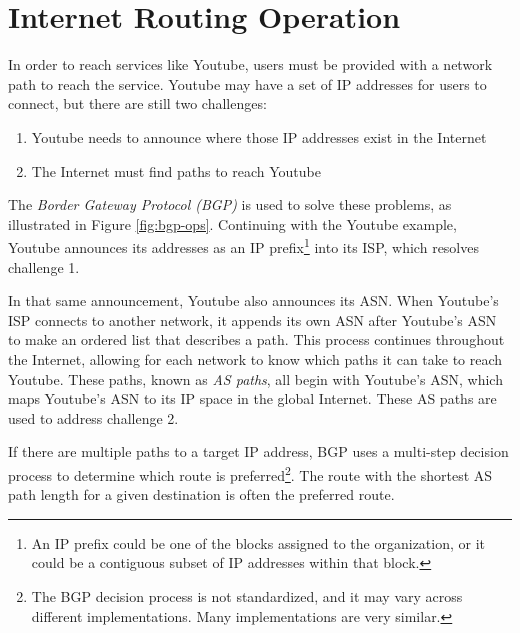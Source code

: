 \documentclass[conference]{IEEEtran}
\begin{document}
\section{Internet Routing Operation}
In order to reach services like Youtube, users must be provided with a network path to reach the service.  Youtube may have a set of IP addresses for users to connect, but there are still two challenges:
\begin{enumerate}
 \item Youtube needs to announce where those IP addresses exist in the Internet
 \item The Internet must find paths to reach Youtube
\end{enumerate}
The \emph{Border Gateway Protocol (BGP)} is used to solve these problems, as illustrated in Figure \ref{fig:bgp-ops}.  Continuing with the Youtube example, Youtube announces its addresses as an IP prefix\footnote{An IP prefix could be one of the blocks assigned to the organization, or it could be a contiguous subset of IP addresses within that block.} into its ISP, which resolves challenge 1.

In that same announcement, Youtube also announces its ASN.  When Youtube's ISP connects to another network, it appends its own ASN after Youtube's ASN to make an ordered list that describes a path.  This process continues throughout the Internet, allowing for each network to know which paths it can take to reach Youtube.  These paths, known as \emph{AS paths}, all begin with Youtube's ASN, which maps Youtube's ASN to its IP space in the global Internet.  These AS paths are used to address challenge 2.

If there are multiple paths to a target IP address, BGP uses a multi-step decision process to determine which route is preferred\footnote{The BGP decision process is not standardized, and it may vary across different implementations.  Many implementations are very similar.}.  The route with the shortest AS path length for a given destination is often the preferred route.
\end{document}
